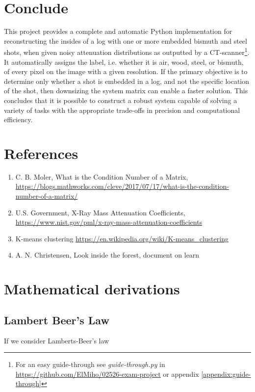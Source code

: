 \documentclass{article}
\begin{document}
\section{Conclude}
\vspace*{-0.3\baselineskip}
This project provides a complete and automatic Python implementation for reconstructing the insides of a log with one or more embedded bismuth and steel shots, when given noisy attenuation distributions as outputted by a CT-scanner\footnote[15]{For an easy guide-through see \textit{guide-through.py} in \url{https://github.com/ElMiho/02526-exam-project} or appendix \ref{appendix:guide-through}}. It automatically assigns the label, i.e. whether it is air, wood, steel, or bismuth, of every pixel on the image with a given resolution. If the primary objective is to determine only whether a shot is embedded in a log, and not the specific location of the shot, then downsizing the system matrix can enable a faster solution. This concludes that it is possible to construct a robust system capable of solving a variety of tasks with the appropriate trade-offs in precision and computational efficiency.

\newpage
\section*{References}
\begin{enumerate}
    \item C. B. Moler, What is the Condition Number of a Matrix, \url{https://blogs.mathworks.com/cleve/2017/07/17/what-is-the-condition-number-of-a-matrix/}
    \item U.S. Government, X-Ray Mass Attenuation Coefficients, \\ \url{https://www.nist.gov/pml/x-ray-mass-attenuation-coefficients}
    \item K-means clustering \url{https://en.wikipedia.org/wiki/K-means_clustering}
    \item A. N. Christensen, Look inside the forest, document on learn
\end{enumerate}






\newpage
\appendix
\section{Mathematical derivations}
\subsection{Lambert Beer's Law}\label{appendix:lambert-beers-law}
If we consider Lamberts-Beer's law
\end{document}
